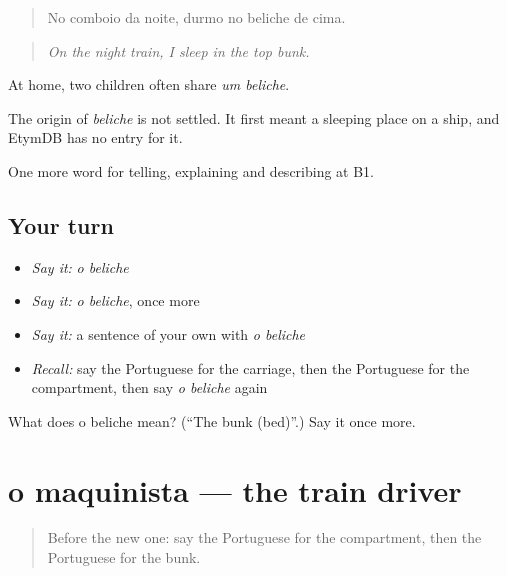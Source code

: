 \begin{quote}
No comboio da noite, durmo no beliche de cima.
\end{quote}

\begin{quote}
\emph{On the night train, I sleep in the top bunk.}
\end{quote}

At home, two children often share \emph{um beliche}.

\begin{cousinweb}
The origin of \emph{beliche} is not settled. It first meant a sleeping place on a ship, and EtymDB has no entry for it.
\end{cousinweb}

\begin{grammarlens}[title={What you've built}]
One more word for telling, explaining and describing at B1.
\end{grammarlens}

\subsection*{Your turn}
\begin{itemize}
\raggedright
  \item \emph{Say it:} \emph{o beliche}
  \item \emph{Say it:} \emph{o beliche}, once more
  \item \emph{Say it:} a sentence of your own with \emph{o beliche}
  \item \emph{Recall:} say the Portuguese for the carriage, then the Portuguese for the compartment, then say \emph{o beliche} again
\end{itemize}

\begin{tcolorbox}[breakable,colback=teal!4,colframe=teal!35!black,title={Before you move on}]
What does o beliche mean? (\textquotedblleft{}The bunk (bed)\textquotedblright{}.) Say it once more.
\end{tcolorbox}
\section[o maquinista]{o maquinista — the train driver}

\label{lesson:PT-C415-maquinista}



\begin{quote}
Before the new one: say the Portuguese for the compartment, then the Portuguese for the bunk.
\end{quote}

